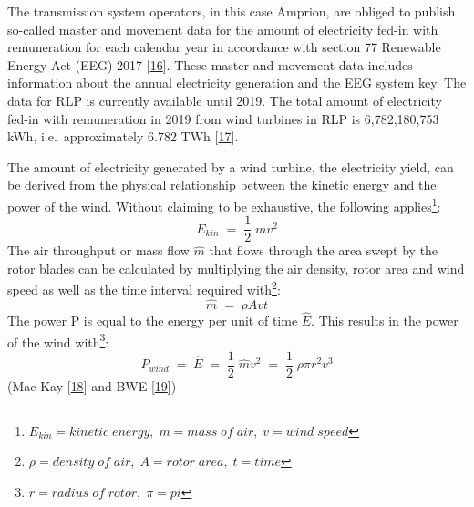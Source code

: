 \documentclass[a4paper,11pt]{article}
\begin{document}
The transmission system operators, in this case Amprion, are obliged to publish so-called master and movement data for the amount of electricity fed-in with remuneration for each calendar year in accordance with section 77 Renewable Energy Act (EEG) 2017 {[}\protect\hyperlink{ref-Bundesgestzblatt.2017}{16}{]}. These master and movement data includes information about the annual electricity generation and the EEG system key. The data for RLP is currently available until 2019. The total amount of electricity fed-in with remuneration in 2019 from wind turbines in RLP is 6,782,180,753 kWh, i.e.~approximately 6.782 TWh {[}\protect\hyperlink{ref-EnergieagenturRheinlandPfalz.2019}{17}{]}.

The amount of electricity generated by a wind turbine, the electricity yield, can be derived from the physical relationship between the kinetic energy and the power of the wind. Without claiming to be exhaustive, the following applies\footnote{\(E_{kin}= kinetic\; energy,\; m=mass\; of\; air,\; v= wind\;speed\)}:
\begin{equation}
E_{kin}\; =\; \frac{1}{2}\;mv^2
\end{equation}
The air throughput or mass flow \(\hat{m}\) that flows through the area swept by the rotor blades can be calculated by multiplying the air density, rotor area and wind speed as well as the time interval required with\footnote{\(\rho= density\; of\; air,\; A= rotor\; area,\; t=time\)}:
\begin{equation}
\hat{m}\;=\;\rho A vt
\end{equation}
The power P is equal to the energy per unit of time \(\hat{E}\). This results in the power of the wind with\footnote{\(r= radius\; of\; rotor, \; \pi=pi\)}:
\begin{equation}
P_{wind}\;=\;\hat{E}\;=\;\frac{1}{2}\;\hat{m}v^2\;=\;\frac{1}{2}\; \rho \pi r^2 v^3
\end{equation}
(Mac Kay {[}\protect\hyperlink{ref-DavidJCMacKay.2009}{18}{]} and BWE {[}\protect\hyperlink{ref-BWE.2021}{19}{]})
\end{document}
